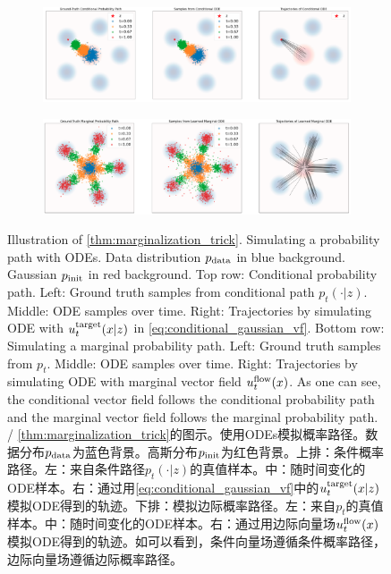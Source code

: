 \begin{figure}[t!]
\centering
   \begin{subfigure}[b]{\textwidth}
   \centering
   \includegraphics[width=\textwidth]{figures/conditional_ode.png}
   \label{fig:Ng1} 
\end{subfigure}
\begin{subfigure}[b]{\textwidth}
    \centering
   \includegraphics[width=\textwidth]{figures/marginal_ode.png}
   \label{fig:Ng2}
\end{subfigure}
\caption{\label{fig:cond_marginal_path_simulation}Illustration of \cref{thm:marginalization_trick}. Simulating a  probability path with ODEs. Data distribution $p_{\rm{data}}$ in blue background. Gaussian $p_{\rm{init}}$ in red background. Top row: Conditional probability path. Left: Ground truth samples from conditional path $p_t(\cdot|z)$. Middle: ODE samples over time. Right: Trajectories by simulating ODE with $u^{\text{target}}_t(x|z)$ in \cref{eq:conditional_gaussian_vf}. Bottom row: Simulating a marginal probability path. Left: Ground truth samples from $p_t$. Middle: ODE samples over time. Right: Trajectories by simulating ODE with marginal vector field $u^{\text{flow}}_t(x)$. As one can see, the conditional vector field follows the conditional probability path and the marginal vector field follows the marginal probability path. / \cref{thm:marginalization_trick}的图示。使用ODEs模拟概率路径。数据分布$p_{\rm{data}}$为蓝色背景。高斯分布$p_{\rm{init}}$为红色背景。上排：条件概率路径。左：来自条件路径$p_t(\cdot|z)$的真值样本。中：随时间变化的ODE样本。右：通过用\cref{eq:conditional_gaussian_vf}中的$u^{\text{target}}_t(x|z)$模拟ODE得到的轨迹。下排：模拟边际概率路径。左：来自$p_t$的真值样本。中：随时间变化的ODE样本。右：通过用边际向量场$u^{\text{flow}}_t(x)$模拟ODE得到的轨迹。如可以看到，条件向量场遵循条件概率路径，边际向量场遵循边际概率路径。}
\end{figure}
